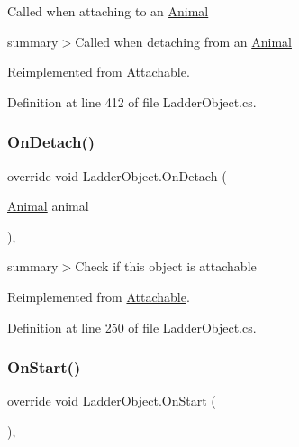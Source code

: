 Called when attaching to an \mbox{\hyperlink{class_animal}{Animal}}

summary$>$Called when detaching from an \mbox{\hyperlink{class_animal}{Animal}}

Reimplemented from \mbox{\hyperlink{class_attachable_a813281e423def538cd834f0db80c9ec8}{Attachable}}.



Definition at line 412 of file Ladder\+Object.\+cs.

\mbox{\label{class_ladder_object_a0d40bcecf87fe56cd97b5550d352e258}} 
\subsubsection{\texorpdfstring{On\+Detach()}{OnDetach()}}
{\footnotesize\ttfamily override void Ladder\+Object.\+On\+Detach (\begin{DoxyParamCaption}\item[{\mbox{\hyperlink{class_animal}{Animal}}}]{animal }\end{DoxyParamCaption})\hspace{0.3cm}{\ttfamily [protected]}, {\ttfamily [virtual]}}



summary$>$Check if this object is attachable



Reimplemented from \mbox{\hyperlink{class_attachable_abe7cf9d7930393610c7c9c4ae14b12d7}{Attachable}}.



Definition at line 250 of file Ladder\+Object.\+cs.

\mbox{\label{class_ladder_object_a2b6508ecfa48b616813c22c113650637}} 
\subsubsection{\texorpdfstring{On\+Start()}{OnStart()}}
{\footnotesize\ttfamily override void Ladder\+Object.\+On\+Start (\begin{DoxyParamCaption}{ }\end{DoxyParamCaption})\hspace{0.3cm}{\ttfamily [protected]}, {\ttfamily [virtual]}}



